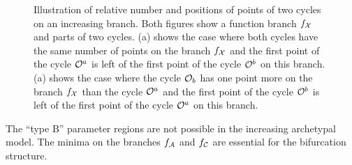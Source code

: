 \begin{figure}
	\centering
	 \quad
	\caption[Illustration of relative number and positions of points of two cycles on an increasing branch]{
		Illustration of relative number and positions of points of two cycles on an increasing branch.
		Both figures show a function branch $f_{\mathcal{X}}$ and parts of two cycles.
		(a) shows the case where both cycles have the same number of points on the branch $f_{\mathcal{X}}$ and the first point of the cycle $\mathcal{O}^a$ is left of the first point of the cycle $\mathcal{O}^b$ on this branch.
		(a) shows the case where the cycle $\mathcal{O}_b$ has one point more on the branch $f_{\mathcal{X}}$ than the cycle $\mathcal{O}^a$ and the first point of the cycle $\mathcal{O}^b$ is left of the first point of the cycle $\mathcal{O}^a$ on this branch.
	}
	\label{fig:add.change.increasing}
\end{figure}

\begin{theorem}
	The ``type B'' parameter regions are not possible in the increasing archetypal model.
	The minima on the branches $f_{\mathcal{A}}$ and $f_{\mathcal{C}}$ are essential for the bifurcation structure.
\end{theorem}

